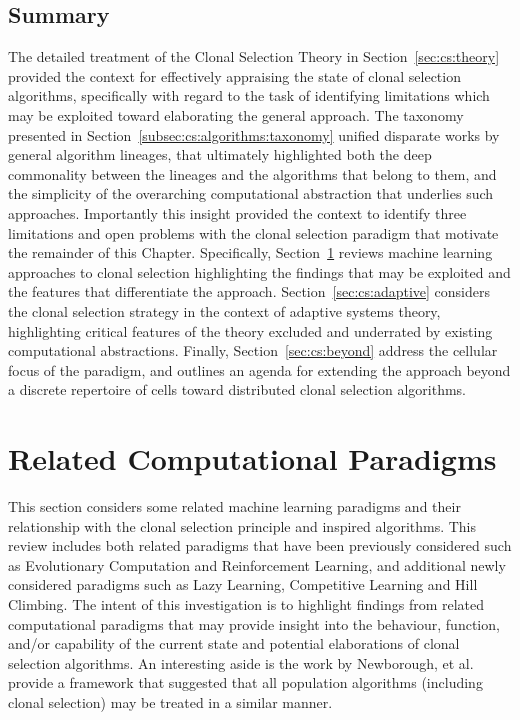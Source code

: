 %
%
\subsection{Summary}
The detailed treatment of the Clonal Selection Theory in Section~\ref{sec:cs:theory} provided the context for effectively appraising the state of clonal selection algorithms, specifically with regard to the task of identifying limitations which may be exploited toward elaborating the general approach.
The taxonomy presented in Section~\ref{subsec:cs:algorithms:taxonomy} unified disparate works by general algorithm lineages, that ultimately highlighted both the deep commonality between the lineages and the algorithms that belong to them, and the simplicity of the overarching computational abstraction that underlies such approaches.
Importantly this insight provided the context to identify three limitations and open problems with the clonal selection paradigm that motivate the remainder of this Chapter. Specifically, Section~\ref{sec:cs:related} reviews machine learning approaches to clonal selection highlighting the findings that may be exploited and the features that differentiate the approach. Section~\ref{sec:cs:adaptive} considers the clonal selection strategy in the context of adaptive systems theory, highlighting critical features of the theory excluded and underrated by existing computational abstractions. Finally, Section~\ref{sec:cs:beyond} address the cellular focus of the paradigm, and outlines an agenda for extending the approach beyond a discrete repertoire of cells toward distributed clonal selection algorithms.


%
%
\section{Related Computational Paradigms}
\label{sec:cs:related}
This section considers some related machine learning paradigms and their relationship with the clonal selection principle and inspired algorithms. This review includes both related paradigms that have been previously considered such as Evolutionary Computation and Reinforcement Learning, and additional newly considered paradigms such as Lazy Learning, Competitive Learning and Hill Climbing. The intent of this investigation is to highlight findings from related computational paradigms that may provide insight into the behaviour, function, and/or capability of the current state and potential elaborations of clonal selection algorithms.
An interesting aside is the work by Newborough, et al. \cite{Newborough2005} provide a framework that suggested that all population algorithms (including clonal selection) may be treated in a similar manner.


